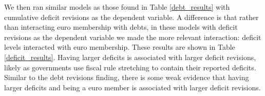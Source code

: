 \documentclass[]{article}
\begin{document}
We then ran similar models as those found in Table \ref{debt_results} with cumulative deficit revisions as the dependent variable. A difference is that rather than interacting euro membership with debts, in these models with deficit revisions as the dependent variable we made the more relevant interaction: deficit levels interacted with euro membership. These results are shown in Table \ref{deficit_results}. Having larger deficits is associated with larger deficit revisions, likely as governments use fiscal rule stretching to contain their reported deficits.  Similar to the debt revisions finding, there is some weak evidence that having larger deficits and being a euro member is associated with larger deficit revisions.

\begin{landscape}
    
\end{landscape}
\end{document}
